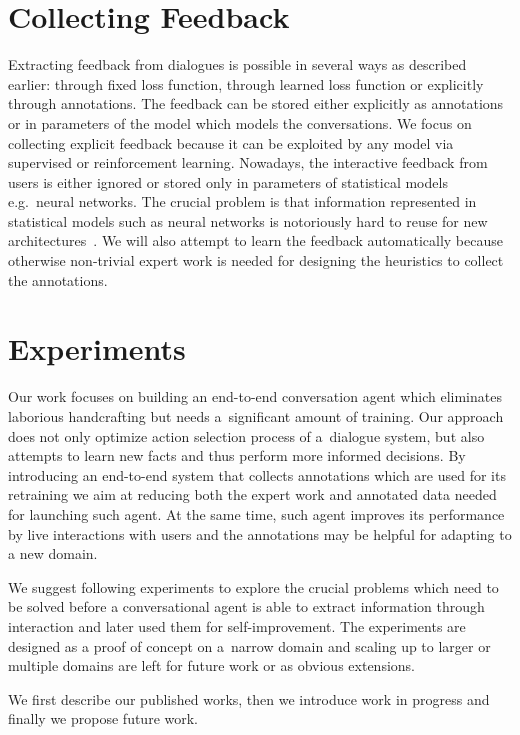 \documentclass[11pt]{article}
\begin{document}
\section{Collecting Feedback}
\label{sec:learn_feedback}
Extracting feedback from dialogues is possible in several ways as described earlier: through fixed loss function, through learned loss function or explicitly through annotations.
The feedback can be stored either explicitly as annotations or in parameters of the model which models the conversations.
We focus on collecting explicit feedback because it can be exploited by any model via supervised or reinforcement learning.
Nowadays, the interactive feedback from users is either ignored or stored only in parameters of statistical models e.g.\ neural networks.
The crucial problem is that information represented in statistical models such as neural networks is notoriously hard to reuse for new architectures~\cite{oquab_learning_2014}.
We will also attempt to learn the feedback automatically because otherwise non-trivial expert work is needed for designing the heuristics to collect the annotations.

\section{Experiments}\label{sec:experiments}
Our work focuses on building an end-to-end conversation agent which eliminates laborious handcrafting but needs a~significant amount of training. 
Our approach does not only optimize action selection process of a~dialogue system, but also attempts to learn new facts and thus perform more informed decisions.
By introducing an end-to-end system that collects annotations which are used for its retraining we aim at reducing both the expert work and annotated data needed for launching such agent.
At the same time, such agent improves its performance by live interactions with users and the annotations may be helpful for adapting to a new domain.


We suggest following experiments to explore the crucial problems which need to be solved before a conversational agent is able to extract information through interaction and later used them for self-improvement.
The experiments are designed as a proof of concept on a~narrow domain and scaling up to larger or multiple domains are left for future work or as obvious extensions. 

We first describe our published works, then we introduce work in progress and finally we propose future work. 
\end{document}
